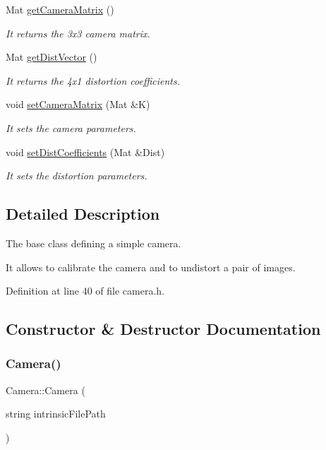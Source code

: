 \begin{DoxyCompactItemize}
Mat \hyperlink{classCamera_af1433656f08f22aa1080d0c6e7a98df6}{get\+Camera\+Matrix} ()
\begin{DoxyCompactList}\small\item\em It returns the 3x3 camera matrix. \end{DoxyCompactList}\item 
Mat \hyperlink{classCamera_a1cd15bc4fd4f0405c7e047af632b9353}{get\+Dist\+Vector} ()
\begin{DoxyCompactList}\small\item\em It returns the 4x1 distortion coefficients. \end{DoxyCompactList}\item 
void \hyperlink{classCamera_ab1d197f991bc02d373d8833f7da2e7eb}{set\+Camera\+Matrix} (Mat \&K)
\begin{DoxyCompactList}\small\item\em It sets the camera parameters. \end{DoxyCompactList}\item 
void \hyperlink{classCamera_a018fb29ce30458045b22eeee47f61057}{set\+Dist\+Coefficients} (Mat \&Dist)
\begin{DoxyCompactList}\small\item\em It sets the distortion parameters. \end{DoxyCompactList}\end{DoxyCompactItemize}


\subsection{Detailed Description}
The base class defining a simple camera. 

It allows to calibrate the camera and to undistort a pair of images. 

Definition at line 40 of file camera.\+h.



\subsection{Constructor \& Destructor Documentation}
\mbox{\label{classCamera_a4a02314716bac5282edd6aee6457f133}} 
\subsubsection{\texorpdfstring{Camera()}{Camera()}\hspace{0.1cm}{\footnotesize\ttfamily [1/2]}}
{\footnotesize\ttfamily Camera\+::\+Camera (\begin{DoxyParamCaption}\item[{string}]{intrinsic\+File\+Path }\end{DoxyParamCaption})}



